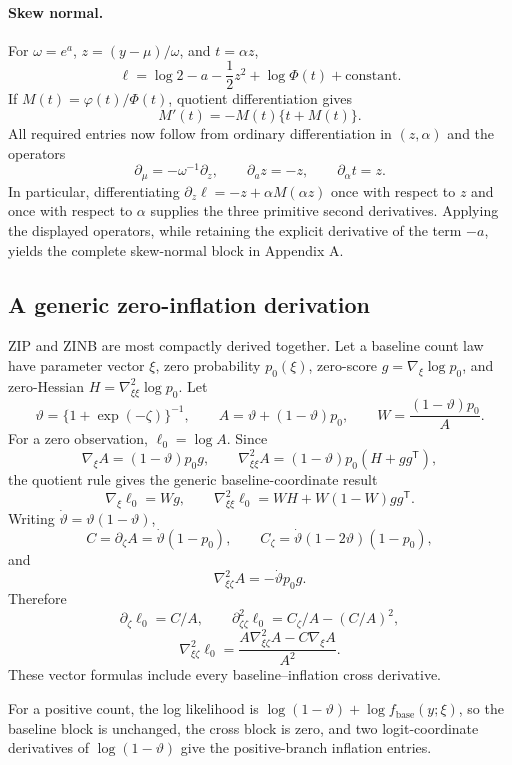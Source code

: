 \documentclass[a4paper,fleqn]{cas-sc}
\newcommand{\T}{\mathsf T}
\numberwithin{equation}{section}
\begin{document}
\paragraph{Skew normal.}
For $\omega=e^a$, $z=(y-\mu)/\omega$, and $t=\alpha z$,
\[
 \ell=\log2-a-\frac12z^2+\log\Phi(t)+\text{constant}.
\]
If $M(t)=\varphi(t)/\Phi(t)$, quotient differentiation gives
\[
 M'(t)=-M(t)\{t+M(t)\}.
\]
All required entries now follow from ordinary differentiation in $(z,\alpha)$ and the operators
\[
 \partial_\mu=-\omega^{-1}\partial_z,\qquad
 \partial_a z=-z,\qquad \partial_\alpha t=z.
\]
In particular, differentiating $\partial_z\ell=-z+\alpha M(\alpha z)$ once with respect to $z$ and once with respect to $\alpha$ supplies the three primitive second derivatives. Applying the displayed operators, while retaining the explicit derivative of the term $-a$, yields the complete skew-normal block in Appendix A.

\subsection{A generic zero-inflation derivation}

ZIP and ZINB are most compactly derived together. Let a baseline count law have parameter vector $\xi$, zero probability $p_0(\xi)$, zero-score
$g=\nabla_\xi\log p_0$, and zero-Hessian
$H=\nabla_{\xi\xi}^2\log p_0$. Let
\[
 \vartheta=\{1+\exp(-\zeta)\}^{-1},\qquad
 A=\vartheta+(1-\vartheta)p_0,\qquad
 W=\frac{(1-\vartheta)p_0}{A}.
\]
For a zero observation, $\ell_0=\log A$. Since
\[
 \nabla_\xi A=(1-\vartheta)p_0g,\qquad
 \nabla_{\xi\xi}^2A=(1-\vartheta)p_0(H+gg^\T),
\]
the quotient rule gives the generic baseline-coordinate result
\begin{equation}
 \nabla_\xi\ell_0=Wg,\qquad
 \nabla_{\xi\xi}^2\ell_0=WH+W(1-W)gg^\T.
 \label{supp:eq:generic-zero}
\end{equation}
Writing $\dot\vartheta=\vartheta(1-\vartheta)$,
\[
 C=\partial_\zeta A=\dot\vartheta(1-p_0),\qquad
 C_\zeta=\dot\vartheta(1-2\vartheta)(1-p_0),
\]
and
\[
 \nabla_{\xi\zeta}^2A=-\dot\vartheta p_0g.
\]
Therefore
\begin{equation}
 \partial_\zeta\ell_0=C/A,\qquad
 \partial_{\zeta\zeta}^2\ell_0=C_\zeta/A-(C/A)^2,
 \label{supp:eq:generic-inflation}
\end{equation}
\[
 \nabla_{\xi\zeta}^2\ell_0
 =\frac{A\nabla_{\xi\zeta}^2A-C\nabla_\xi A}{A^2}.
\]
These vector formulas include every baseline--inflation cross derivative.

For a positive count, the log likelihood is
$\log(1-\vartheta)+\log f_{\mathrm{base}}(y;\xi)$, so the baseline block is unchanged, the cross block is zero, and two logit-coordinate derivatives of $\log(1-\vartheta)$ give the positive-branch inflation entries.
\end{document}
